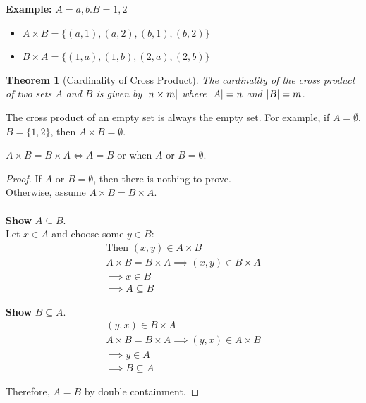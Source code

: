 \documentclass[12pt]{article}
\DeclarePairedDelimiter\abs{\lvert}{\rvert}
\newtheorem{theorem}{Theorem}
\theoremstyle{definition}
\begin{document}
    \textbf{Example:} $A = {a,b}. B = {1, 2}$
    \begin{itemize}
        \item $A \times B = \{(a,1), (a,2), (b,1), (b,2)\}$
        \item $B \times A = \{(1,a), (1,b), (2,a), (2,b)\}$ \\
    \end{itemize}

    \begin{theorem}[Cardinality of Cross Product]
        The cardinality of the cross product of two sets $A$ and $B$ is given by
        $\abs{n \times m}$ where $\abs{A} = n$ and $\abs{B} = m$.
    \end{theorem}

    The cross product of an empty set is always the empty set. For example, if $A=\emptyset$,
    $B=\{1,2\}$, then $A \times B = \emptyset$.

    $A \times B = B \times A \iff A = B$ or when $A$ or $B = \emptyset$.
    \begin{proof}
        If $A$ or $B = \emptyset$, then there is nothing to prove. \\
        Otherwise, assume $A \times B = B \times A$. \\\\
        \textbf{Show} $A \subseteq B$. \\
        Let $x \in A$ and choose some $y \in B$:
        \begin{align*}
            \text{Then } (x,y) \in A \times B \\
            A \times B = B \times A \implies (x,y) \in B \times A \\
            \implies x \in B \\
            \implies A \subseteq B
        \end{align*}
        
        \textbf{Show} $B \subseteq A$. \\
        \begin{align*}
            (y,x) \in B \times A \\
            A \times B = B \times A \implies (y, x) \in A \times B \\
            \implies y \in A \\
            \implies B \subseteq A
        \end{align*}

        Therefore, $A = B$ by double containment.
        
    \end{proof}
\end{document}

